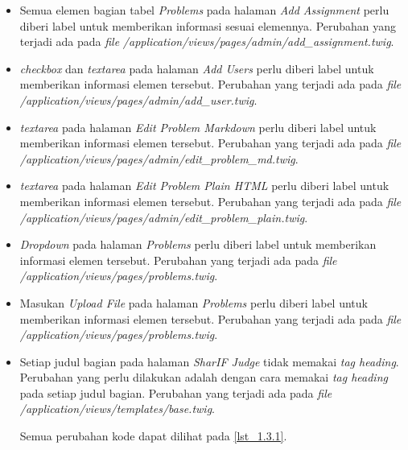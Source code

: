 \begin{itemize}
	\item Semua elemen bagian tabel \textit{Problems} pada halaman \textit{Add Assignment} perlu diberi label untuk memberikan informasi sesuai elemennya. Perubahan yang terjadi ada pada \textit{file} \textit{/application/views/pages/admin/add\_assignment.twig}.

	\item \textit{checkbox} dan \textit{textarea} pada halaman \textit{Add Users} perlu diberi label untuk memberikan informasi elemen tersebut. Perubahan yang terjadi ada pada \textit{file} \textit{/application/views/pages/admin/add\_user.twig}.

	\item \textit{textarea} pada halaman \textit{Edit Problem Markdown} perlu diberi label untuk memberikan informasi elemen tersebut. Perubahan yang terjadi ada pada \textit{file} \textit{/application/views/pages/admin/edit\_problem\_md.twig}.

	\item \textit{textarea} pada halaman \textit{Edit Problem Plain HTML} perlu diberi label untuk memberikan informasi elemen tersebut. Perubahan yang terjadi ada pada \textit{file} \textit{/application/views/pages/admin/edit\_problem\_plain.twig}.
	
	\item \textit{Dropdown} pada halaman \textit{Problems} perlu diberi label untuk memberikan informasi elemen tersebut. Perubahan yang terjadi ada pada \textit{file} \textit{/application/views/pages/problems.twig}.

	\item Masukan \textit{Upload File} pada halaman \textit{Problems} perlu diberi label untuk memberikan informasi elemen tersebut. Perubahan yang terjadi ada pada \textit{file} \textit{/application/views/pages/problems.twig}.
	
	\item Setiap judul bagian pada halaman \textit{SharIF Judge} tidak memakai \textit{tag heading}. Perubahan yang perlu dilakukan adalah dengan cara memakai \textit{tag heading} pada setiap judul bagian.
	Perubahan yang terjadi ada pada \textit{file} \textit{/application/views/templates/base.twig}.
	
	Semua perubahan kode dapat dilihat pada \ref{lst_1.3.1}.
	

\end{itemize}
